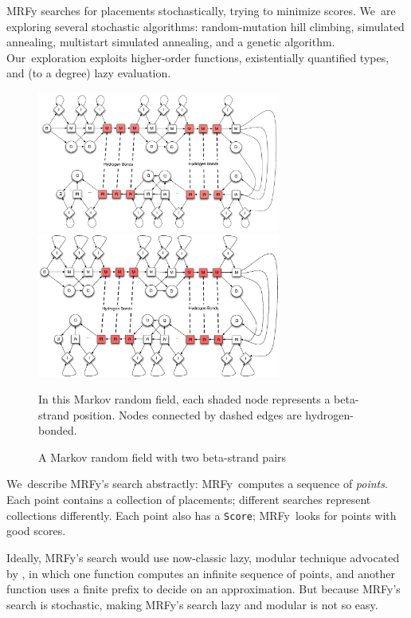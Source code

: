 \documentclass[nonatbib]{sigplanconf}
\newcommand\mrfy{MRFy} %
\begin{document}
MRFy searches for placements stochastically,
trying to minimize scores.
We~are exploring several stochastic algorithms: random-mutation hill
climbing, simulated  
annealing, multistart simulated annealing, and a genetic algorithm.
Our~exploration exploits higher-order functions, existentially
quantified types, and (to a degree) lazy evaluation.



\begin{figure}
\ifpdfmadness
\centerline{\includegraphics[width=8cm]{mrf_interleave_diagram.pdf}} 
\else
\centerline{\includegraphics[width=8cm]{mrf_interleave_diagram.eps}} 
\fi
In this Markov random field,
each shaded node represents a beta-strand position.
Nodes connected by dashed edges are hydrogen-bonded.

\caption{A Markov random field with two beta-strand pairs}
\label{mrf} 
\end{figure}





We~describe \mrfy's search abstractly: \mrfy\ computes a sequence
of \emph{points}. 
Each point contains
a collection of {placements}; different searches represent
collections differently.
Each point also has a \texttt{Score}; \mrfy\ looks for points with
good scores.

Ideally, MRFy's search would use now-classic lazy, modular
technique advocated by \citet{hughes:why}, in which one function
computes an infinite sequence of points, and another function
uses a finite prefix to decide on an approximation.
But because MRFy's search is stochastic, 
making MRFy's search lazy and modular is not so easy.
\end{document}
